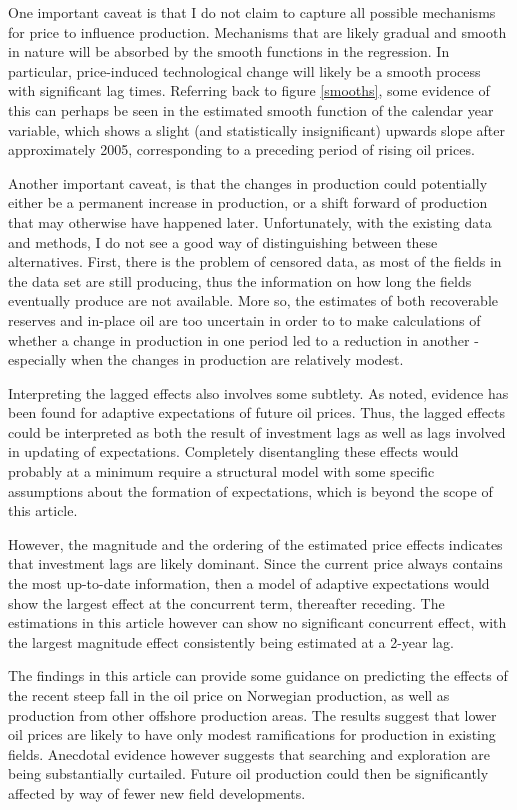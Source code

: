 \documentclass[12pt]{article}
\begin{document}
One important caveat is that I do not claim to capture all possible mechanisms for price to influence production.  Mechanisms that are likely gradual and smooth in nature will be absorbed by the smooth functions in the regression. In particular, price-induced technological change will likely be a smooth process with significant lag times. Referring back to figure \ref{smooths}, some evidence of this can perhaps be seen in the estimated smooth function of the calendar year variable, which shows a slight (and statistically insignificant) upwards slope after approximately 2005, corresponding to a preceding period of rising oil prices.   

Another important caveat, is that the changes in production could potentially either be a permanent increase in production, or a shift forward of production that may otherwise have happened later. Unfortunately, with the existing data and methods, I do not see a good way of distinguishing between these alternatives. First, there is the problem of censored data, as most of the fields in the data set are still producing, thus the information on how long the fields eventually produce are not available.  More so, the estimates of both recoverable reserves and in-place oil are too uncertain in order to to make calculations of whether a change in production in one period led to a reduction in another - especially when the changes in production are relatively modest.

Interpreting the lagged effects also involves some subtlety. As noted, evidence has been found for adaptive expectations of future oil prices.  Thus, the lagged effects could be interpreted as both the result of investment lags as well as lags involved in updating of expectations. Completely disentangling these effects would probably at a minimum require a structural model with some specific assumptions about the formation of expectations, which is beyond the scope of this article. 

However, the magnitude and the ordering of the estimated price effects indicates that investment lags are likely dominant. Since the current price always contains the most up-to-date information, then a model of adaptive expectations would show the largest effect at the concurrent term, thereafter receding. The estimations in this article however can show no significant concurrent effect, with the largest magnitude effect consistently being estimated at a 2-year lag.

The findings in this article can provide some guidance on predicting the effects of the recent steep fall in the oil price on Norwegian production, as well as production from other offshore production areas. The results suggest that lower oil prices are likely to have only modest ramifications for production in existing fields.  Anecdotal evidence however suggests that searching and exploration are being substantially curtailed. Future oil production could then be significantly affected by way of fewer new field developments.
\end{document}
